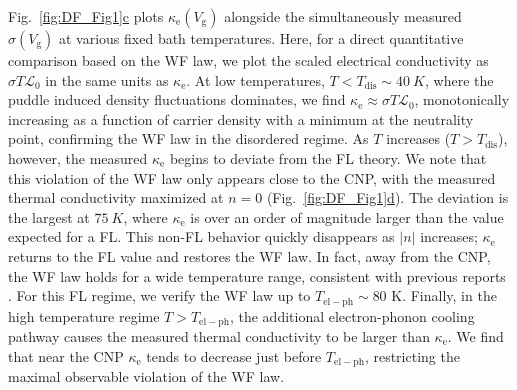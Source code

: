 Fig.~\hyperref[fig:DF_Fig1]{\ref*{fig:DF_Fig1}c} plots $\kappa_{\mathrm{e}}(V_{\mathrm{g}})$ alongside the simultaneously measured $\sigma(V_{\mathrm{g}})$ at various fixed bath temperatures. Here, for a direct quantitative comparison based on the WF law, we plot the scaled electrical conductivity as $\sigma T\mathcal{L}_0$ in the same units as $\kappa_{\mathrm{e}}$. At low temperatures, $T<T_{\mathrm{dis}}\sim 40~K$, where the puddle induced density fluctuations dominates, we find $\kappa_{\mathrm{e}}\approx\sigma T\mathcal{L}_0$, monotonically increasing as a function of carrier density with a minimum at the neutrality point, confirming the WF law in the disordered regime. As $T$ increases ($T>T_{\mathrm{dis}}$), however, the measured $\kappa_{\mathrm{e}}$ begins to deviate from the FL theory. We note that this violation of the WF law only appears close to the CNP, with the measured thermal conductivity maximized at $n=0$ (Fig.~\hyperref[fig:DF_Fig1]{\ref*{fig:DF_Fig1}d}).
The deviation is the largest at  $75~K$, where $\kappa_{\mathrm{e}}$ is over an order of magnitude larger than the value expected for a FL.   This non-FL behavior quickly disappears as $|n|$ increases; $\kappa_{\mathrm{e}}$ returns to the FL value and restores the WF law.   In fact, away from the CNP, the WF law holds for a wide temperature range, consistent with previous reports \cite{crossno_development_2015, yigen_wiedemannfranz_2014, fong_measurement_2013}.    For this FL regime, we verify the WF law up to $T_{\mathrm{el-ph}} \sim 80$ K.  Finally, in the high temperature regime $T>T_{\mathrm{el-ph}}$, the additional electron-phonon cooling pathway causes the measured thermal conductivity to be larger than $\kappa_{\mathrm{e}}$.  We find that near the CNP $\kappa_{\mathrm{e}}$ tends to decrease just before $T_{\mathrm{el-ph}}$, restricting the maximal observable violation of the WF law.

